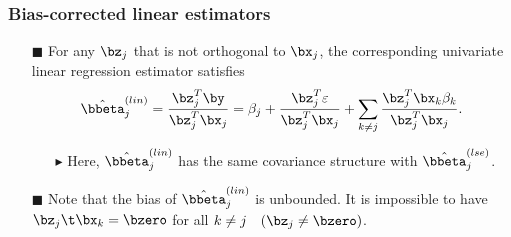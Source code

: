\begin{frame}
\frametitle{Bias-corrected linear estimators}
\begin{itemize}

\item[$\blacksquare$] For any $\bz_{j}$ that is not orthogonal to $\bx_{j}$, the corresponding univariate linear regression estimator satisfies
\begin{equation*}
\hat{\bbeta}^{(lin)}_{j}= \frac{\bz^{T}_{j} \by}{\bz^{T}_{j} \bx_{j}}= \beta_j + \frac{\bz_j^T \varepsilon}{\bz_j^T\bx_j}
+ \sum_{k\neq j}\frac{\bz_j^T\bx_k\beta_k}{\bz_j^T\bx_j}.
\end{equation*}
  \begin{itemize}
  \item[$\blacktriangleright$] Here,  $\hat{\bbeta}^{(lin)}_{j}$ has the same covariance structure with $\hat{\bbeta}^{(lse)}_{j}$.
  \end{itemize}
\item[$\blacksquare$] Note that the bias of $\hat{\bbeta}^{(lin)}_{j}$ is unbounded. It is impossible to have $\bz_{j}\t \bx_{k}=\bzero$ for all $k\neq j \quad (\bz_{j}\neq\bzero)$.
\end{itemize}
\end{frame}


